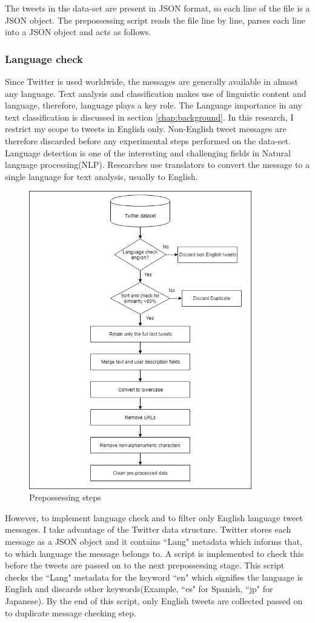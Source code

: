 The tweets in the data-set are present in JSON format, so each line of the file is a JSON object. The prepossessing script reads the file line by line, parses each line into a JSON object and acts as follows.

\subsubsection{Language check}
Since Twitter is used worldwide, the messages are generally available in almost any language. Text analysis and classification makes use of linguistic content and language, therefore, language plays a key role. The Language importance in any text classification is discussed in section \ref{chap:background}. In this research, I restrict my scope to tweets in English only. Non-English tweet messages are therefore discarded before any experimental steps performed on the data-set. 
Language detection is one of the interesting and challenging fields in Natural language processing(NLP). Researches use translators to convert the message to a single language for text analysis, usually to English.
\begin{figure}
    \centering
    \includegraphics[width=10cm\linewidth,height=13cm]{thesis_template/images/preprocessing.png}
    \caption{Prepossessing steps}
    \label{fig:preprocessing}
\end{figure}
However, to implement language check and to filter only English language tweet messages. I take advantage of the Twitter data structure. Twitter stores each message as a JSON object and it contains ``Lang" metadata which informs that, to which language the message belongs to. A script is implemented to check this before the tweets are passed on to the next prepossessing stage. This script checks the ``Lang" metadata for the keyword ``en" which signifies the language is English and discards other keywords(Example, ``es" for Spanish, ``jp" for Japanese). By the end of this script, only English tweets are collected passed on to duplicate message checking step.  

